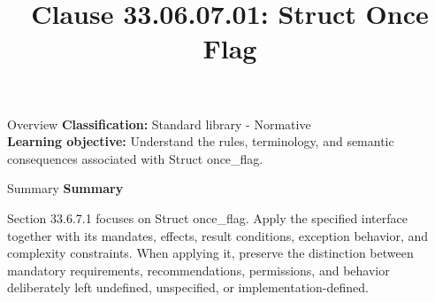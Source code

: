 \documentclass[10pt,letterpaper]{article}
\title{Clause 33.06.07.01: Struct Once Flag}
\author{}
\date{}
\begin{document}
\maketitle
\begin{CornellOverviewBox}{Overview}
\textbf{Classification:} Standard library - Normative\\[2pt]
\textbf{Learning objective:} Understand the rules, terminology, and semantic consequences associated with Struct once\_flag.
\end{CornellOverviewBox}\begin{CornellSummaryBox}{Summary}
{\sffamily\bfseries\color{Accent} Summary}\par\vspace{3pt}Section 33.6.7.1 focuses on Struct once\_flag. Apply the specified interface together with its mandates, effects, result conditions, exception behavior, and complexity constraints. When applying it, preserve the distinction between mandatory requirements, recommendations, permissions, and behavior deliberately left undefined, unspecified, or implementation-defined.
\end{CornellSummaryBox}
\end{document}
